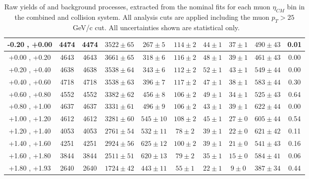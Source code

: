 \begin{table}[h!]
{\begin{tabular}{|c|*9c|}
    \hline
    -0.20 , +0.00 & 4474 & 4474 & $3522 \pm 65$ & $267 \pm 5$ & $114 \pm 2$ & $44 \pm 1$ & $37 \pm 1$ & $490 \pm 43$ & 0.01\\
    \hline
    +0.00 , +0.20 & 4643 & 4643 & $3661 \pm 65$ & $318 \pm 6$ & $116 \pm 2$ & $48 \pm 1$ & $39 \pm 1$ & $461 \pm 43$ & 0.00\\
    \hline
    +0.20 , +0.40 & 4638 & 4638 & $3538 \pm 64$ & $343 \pm 6$ & $112 \pm 2$ & $52 \pm 1$ & $43 \pm 1$ & $549 \pm 44$ & 0.00\\
    \hline
    +0.40 , +0.60 & 4718 & 4718 & $3538 \pm 63$ & $396 \pm 7$ & $117 \pm 2$ & $47 \pm 1$ & $38 \pm 1$ & $583 \pm 44$ & 0.30\\
    \hline
    +0.60 , +0.80 & 4552 & 4552 & $3382 \pm 62$ & $456 \pm 8$ & $106 \pm 2$ & $49 \pm 1$ & $34 \pm 1$ & $525 \pm 43$ & 0.64\\
    \hline
    +0.80 , +1.00 & 4637 & 4637 & $3331 \pm 61$ & $496 \pm 9$ & $106 \pm 2$ & $43 \pm 1$ & $39 \pm 1$ & $622 \pm 44$ & 0.00\\
    \hline
    +1.00 , +1.20 & 4612 & 4612 & $3281 \pm 60$ & $545 \pm 10$ & $108 \pm 2$ & $45 \pm 1$ & $27 \pm 0$ & $605 \pm 44$ & 0.54\\
    \hline
    +1.20 , +1.40 & 4053 & 4053 & $2761 \pm 54$ & $532 \pm 11$ & $78 \pm 2$ & $39 \pm 1$ & $22 \pm 0$ & $621 \pm 42$ & 0.11\\
    \hline
    +1.40 , +1.60 & 4251 & 4251 & $2924 \pm 56$ & $625 \pm 12$ & $100 \pm 2$ & $39 \pm 1$ & $21 \pm 0$ & $541 \pm 43$ & 0.16\\
    \hline
    +1.60 , +1.80 & 3844 & 3844 & $2511 \pm 51$ & $620 \pm 13$ & $79 \pm 2$ & $35 \pm 1$ & $15 \pm 0$ & $584 \pm 41$ & 0.06\\
    \hline
    +1.80 , +1.93 & 2640 & 2640 & $1724 \pm 42$ & $443 \pm 11$ & $55 \pm 1$ & $22 \pm 1$ & $9 \pm 0$ & $387 \pm 34$ & 0.44\\
    \hline
  \end{tabular}
  }
  \caption{Raw yields of \WToMuNuMi and background processes, extracted from the nominal fits for each muon $\eta_{CM}$ bin in the combined \pPb and \Pbp collision system. All analysis cuts are applied including the muon $p_{T} > 25$~GeV/c cut. All uncertainties shown are statistical only.}
  \label{tab:RawYields_WToMuMi_PA}
\end{table}


